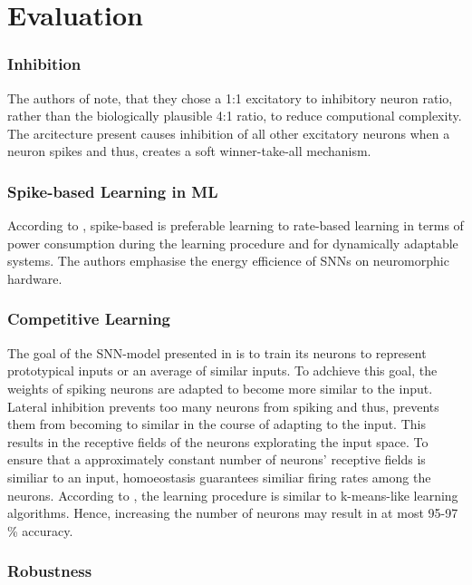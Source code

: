 \section{Evaluation}
\label{sec:evaluation}

\subsubsection{Inhibition}
The authors of \cite{SNN} note, that they chose a 1:1 excitatory to inhibitory neuron ratio, rather than the biologically plausible 4:1 ratio, 
to reduce computional complexity.
The arcitecture present causes inhibition of all other excitatory neurons when a neuron spikes and thus, 
creates a soft winner-take-all mechanism.


\subsubsection{Spike-based Learning in ML}
According to \cite{SNN}, spike-based is preferable learning to rate-based learning in terms of power consumption during the learning procedure and for 
dynamically adaptable systems.
The authors emphasise the energy efficience of \acp{SNN} on neuromorphic hardware.


\subsubsection{Competitive Learning}
The goal of the \ac{SNN}-model presented in \cite{SNN} is to train its neurons to represent prototypical inputs or an average of similar inputs.
To adchieve this goal, the weights of spiking neurons are adapted to become more similar to the input.
Lateral inhibition prevents too many neurons from spiking and thus, prevents them from becoming to similar in the course of adapting to the input.
This results in the receptive fields of the neurons explorating the input space.
To ensure that a approximately constant number of neurons' receptive fields is similiar to an input, 
homoeostasis guarantees similiar firing rates among the neurons.
According to \cite{SNN}, the learning procedure is similar to k-means-like learning algorithms.
Hence, increasing the number of neurons may result in at most 95-97 \% accuracy.

\subsubsection{Robustness}